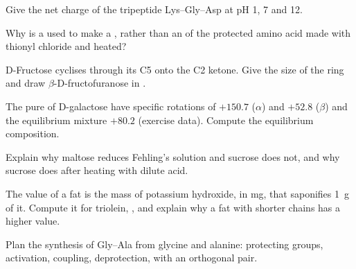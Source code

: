 \begin{exercise}[$\star\star$]\label{exo:b2:biomolecules:5}
Give the net charge of the tripeptide Lys--Gly--Asp at pH 1, 7 and 12.
\end{exercise}

\begin{exercise}[$\star\star$]\label{exo:b2:biomolecules:6}
Why is a  used to make a , rather than an  of the protected amino
acid made with thionyl chloride and heated?
\end{exercise}

\begin{exercise}[$\star\star$]\label{exo:b2:biomolecules:7}
D-Fructose cyclises through its C5  onto the C2 ketone. Give the size of the ring and draw
$\beta$-D-fructofuranose in .
\end{exercise}

\begin{exercise}[$\star\star$]\label{exo:b2:biomolecules:8}
The pure  of D-galactose have specific rotations of $+150.7$ ($\alpha$) and $+52.8$ ($\beta$) and
the equilibrium mixture $+80.2$ (exercise data). Compute the equilibrium composition.
\end{exercise}

\begin{exercise}[$\star\star$]\label{exo:b2:biomolecules:9}
Explain why maltose reduces Fehling's solution and sucrose does not, and why sucrose does after
heating with dilute acid.
\end{exercise}

\begin{exercise}[$\star\star\star$]\label{exo:b2:biomolecules:10}
The  value of a fat is the mass of potassium hydroxide, in mg, that saponifies 1~g of it.
Compute it for triolein, , and explain why a fat with shorter chains has a higher value.
\end{exercise}

\begin{exercise}[$\star\star\star$]\label{exo:b2:biomolecules:11}
Plan the synthesis of Gly--Ala from glycine and alanine: protecting groups, activation, coupling,
deprotection, with an orthogonal pair.
\end{exercise}

